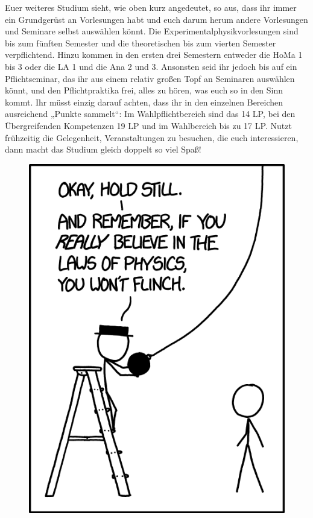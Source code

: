 Euer weiteres Studium sieht, wie oben kurz angedeutet, so aus, dass ihr immer ein Grundgerüst an Vorlesungen habt und euch darum herum andere Vorlesungen und Seminare selbst auswählen könnt. Die Experimentalphysikvorlesungen sind bis zum fünften Semester und die theoretischen bis zum vierten Semester verpflichtend. Hinzu kommen in den ersten drei Semestern entweder die \gls{HoMa} 1 bis 3 oder die \gls{LA} 1 und die \gls{Ana} 2 und 3. Ansonsten seid ihr jedoch bis auf ein Pflichtseminar, das ihr aus einem relativ großen Topf an Seminaren auswählen könnt, und den Pflichtpraktika frei, alles zu hören, was euch so in den Sinn kommt. Ihr müsst einzig darauf achten, dass ihr in den einzelnen Bereichen ausreichend „Punkte sammelt“: Im Wahlpflichtbereich sind das 14 \gls{LP}, bei den Übergreifenden Kompetenzen 19 \gls{LP} und im Wahlbereich bis zu 17 \gls{LP}. Nutzt frühzeitig die Gelegenheit, Veranstaltungen zu besuchen, die euch interessieren, dann macht das Studium gleich doppelt so viel Spaß!

\begin{figure}[b]
	\centering
	\includegraphics[width=.85\linewidth]{bilder/laws_of_physics_2x.png}
\end{figure}
\vfill \eject

